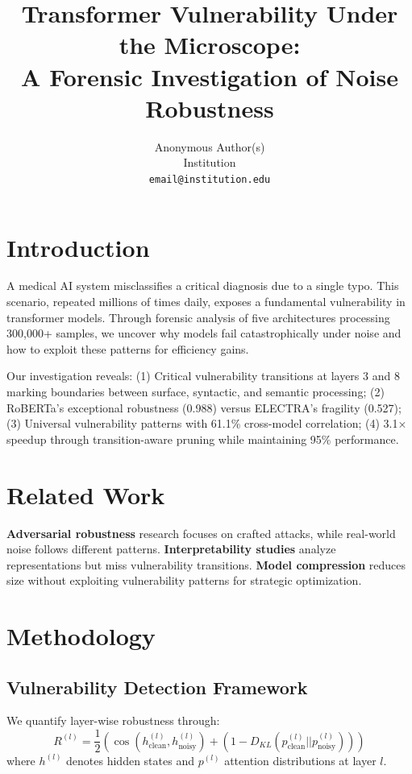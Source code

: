 \documentclass{article}
\title{Transformer Vulnerability Under the Microscope:\\A Forensic Investigation of Noise Robustness}
\author{%
  Anonymous Author(s)\\
  Institution\\
  \texttt{email@institution.edu}
}
\begin{document}
\maketitle



\section{Introduction}
A medical AI system misclassifies a critical diagnosis due to a single typo. This scenario, repeated millions of times daily, exposes a fundamental vulnerability in transformer models. Through forensic analysis of five architectures processing 300,000+ samples, we uncover why models fail catastrophically under noise and how to exploit these patterns for efficiency gains.

Our investigation reveals: (1) Critical vulnerability transitions at layers 3 and 8 marking boundaries between surface, syntactic, and semantic processing; (2) RoBERTa's exceptional robustness (0.988) versus ELECTRA's fragility (0.527); (3) Universal vulnerability patterns with 61.1\% cross-model correlation; (4) 3.1× speedup through transition-aware pruning while maintaining 95\% performance.

\section{Related Work}
\textbf{Adversarial robustness} research \cite{jin2020bert,belinkov2018synthetic} focuses on crafted attacks, while real-world noise follows different patterns. \textbf{Interpretability studies} \cite{tenney2019bert,rogers2020primer} analyze representations but miss vulnerability transitions. \textbf{Model compression} \cite{sanh2019distilbert,jiao2020tinybert} reduces size without exploiting vulnerability patterns for strategic optimization.

\section{Methodology}

\subsection{Vulnerability Detection Framework}
We quantify layer-wise robustness through:
\begin{equation}
R^{(l)} = \frac{1}{2}\left(\cos(h^{(l)}_{\text{clean}}, h^{(l)}_{\text{noisy}}) + (1 - D_{KL}(p^{(l)}_{\text{clean}} || p^{(l)}_{\text{noisy}}))\right)
\label{eq:robustness}
\end{equation}
where $h^{(l)}$ denotes hidden states and $p^{(l)}$ attention distributions at layer $l$.
\end{document}
